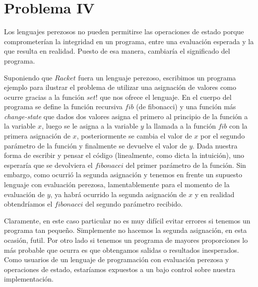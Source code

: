 \documentclass[12pt]{article}
\begin{document}
\section*{Problema IV}
Los lenguajes perezosos no pueden permitirse las operaciones de estado porque comprometerían la integridad en un programa, entre una evaluación
esperada y la que resulta en realidad. Puesto de esa manera, cambiaría el significado del programa.
\par 
Suponiendo que $Racket$ fuera un lenguaje perezoso, escribimos un programa ejemplo para ilustrar el problema de utilizar una asignación de valores
como ocurre gracias a la función $set!$ que nos ofrece el lenguaje.
En el cuerpo del programa se define la función recursiva $fib$ (de fibonacci) y una función más \textit{change-state} que dados dos valores asigna el primero al principio de la función a la variable $x$, luego se le asigna a la variable $y$ la llamada a la función $fib$ con la primera asignación de $x$, posteriormente se cambia el valor de $x$ por el segundo parámetro de la función y finalmente se devuelve el valor de $y$. Dada nuestra forma de escribir y pensar el código (linealmente, como dicta la intuición), uno esperaría que se devolviera el $fibonacci$ del primer parámetro de la función. Sin embargo, como ocurrió la segunda asignación y tenemos en frente un supuesto lenguaje con evaluación perezosa, lamentablemente para el momento de la evaluación de $y$, ya habrá ocurrido la segunda asignación de $x$ y en realidad obtendríamos el $fibonacci$ del segundo parámetro recibido.\par
Claramente, en este caso particular no es muy difícil evitar errores si tenemos un programa tan pequeño. Simplemente no hacemos la segunda asignación, en esta ocasión, futil. Por otro lado si tenemos un programa de
mayores proporciones lo más probable que ocurra es que obtengamos salidas o resultados inesperados. Como usuarios de un lenguaje de programación con evaluación perezosa y operaciones de estado, estaríamos expuestos a un bajo control sobre nuestra implementación.
\end{document}
